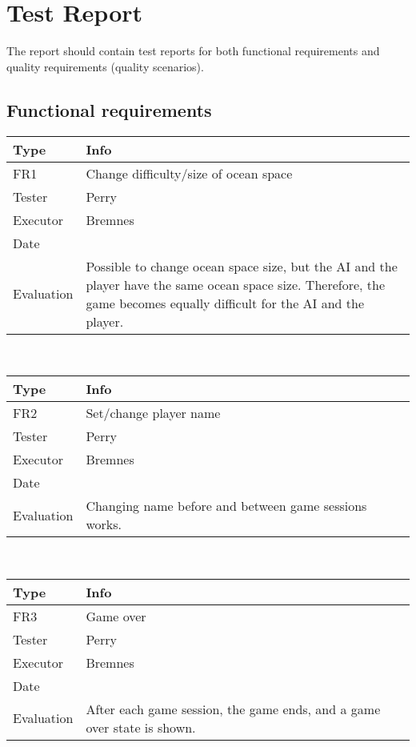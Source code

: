 \chapter{Test Report}

The report should contain test reports for both functional requirements and quality requirements (quality scenarios).

\section{Functional requirements}

\begin{tabular}{|l|l|}
	\hline
	\bf{Type}	& \bf{Info} \\
	\hline
	FR1			& Change difficulty/size of ocean space \\
	Tester		& Perry \\
	Executor	& Bremnes \\
	Date		& \date{\today} \\
	Evaluation	& Possible to change ocean space size, but the AI and the player have the same ocean space size. Therefore, the game becomes equally difficult for the AI and the player.\\
	\hline
\end{tabular}
\\
\begin{tabular}{|l|l|}
	\hline
	\bf{Type}	& \bf{Info} \\
	\hline
	FR2			& Set/change player name \\
	Tester		& Perry \\
	Executor	& Bremnes \\
	Date		& \date{\today} \\
	Evaluation	& Changing name before and between game sessions works. \\
	\hline
\end{tabular}
\\
\begin{tabular}{|l|l|}
	\hline
	\bf{Type}	& \bf{Info} \\
	\hline
	FR3			& Game over \\
	Tester		& Perry \\
	Executor	& Bremnes \\
	Date		& \date{\today} \\
	Evaluation	& After each game session, the game ends, and a game over state is shown. \\
	\hline
\end{tabular}

